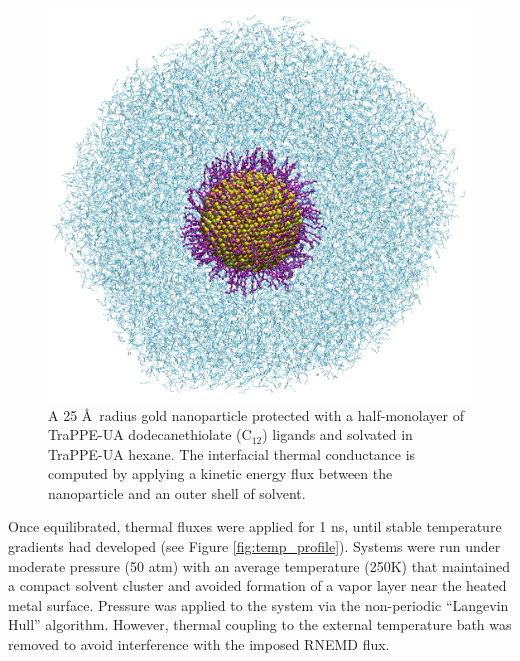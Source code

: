 \begin{figure}
  \includegraphics[width=\linewidth]{figures/NP25_C12h1}
  \caption{A 25 \AA\ radius gold nanoparticle protected with a
    half-monolayer of TraPPE-UA dodecanethiolate (C$_{12}$) ligands
    and solvated in TraPPE-UA hexane. The interfacial thermal
    conductance is computed by applying a kinetic energy flux between
    the nanoparticle and an outer shell of solvent.}
  \label{fig:NP25_C12h1}
\end{figure}

Once equilibrated, thermal fluxes were applied for 1 ns, until stable
temperature gradients had developed (see Figure
\ref{fig:temp_profile}). Systems were run under moderate pressure (50
atm) with an average temperature (250K) that maintained a compact
solvent cluster and avoided formation of a vapor layer near the heated
metal surface.  Pressure was applied to the system via the
non-periodic ``Langevin Hull'' algorithm.\cite{Vardeman2011} However,
thermal coupling to the external temperature bath was removed to avoid
interference with the imposed RNEMD flux.

